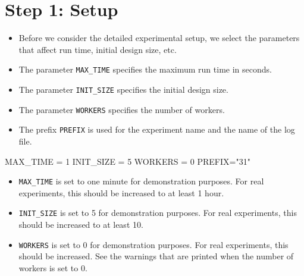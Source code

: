 \documentclass[
  letterpaper,
  DIV=11,
  numbers=noendperiod]{scrreprt}
\newenvironment{Shaded}{\begin{snugshade}}{\end{snugshade}}
\newcommand{\DecValTok}[1]{\textcolor[rgb]{0.68,0.00,0.00}{#1}}
\newcommand{\NormalTok}[1]{\textcolor[rgb]{0.00,0.23,0.31}{#1}}
\newcommand{\OperatorTok}[1]{\textcolor[rgb]{0.37,0.37,0.37}{#1}}
\newcommand{\StringTok}[1]{\textcolor[rgb]{0.13,0.47,0.30}{#1}}
\providecommand{\tightlist}{%
  \setlength{\itemsep}{0pt}\setlength{\parskip}{0pt}}\usepackage{longtable,booktabs,array}
\begin{document}
\hypertarget{sec-setup-31}{%
\section{Step 1: Setup}\label{sec-setup-31}}

\begin{itemize}
\tightlist
\item
  Before we consider the detailed experimental setup, we select the
  parameters that affect run time, initial design size, etc.
\item
  The parameter \texttt{MAX\_TIME} specifies the maximum run time in
  seconds.
\item
  The parameter \texttt{INIT\_SIZE} specifies the initial design size.
\item
  The parameter \texttt{WORKERS} specifies the number of workers.
\item
  The prefix \texttt{PREFIX} is used for the experiment name and the
  name of the log file.
\end{itemize}

\begin{Shaded}
\begin{Highlighting}[]
\NormalTok{MAX\_TIME }\OperatorTok{=} \DecValTok{1}
\NormalTok{INIT\_SIZE }\OperatorTok{=} \DecValTok{5}
\NormalTok{WORKERS }\OperatorTok{=} \DecValTok{0}
\NormalTok{PREFIX}\OperatorTok{=}\StringTok{"31"}
\end{Highlighting}
\end{Shaded}

\begin{tcolorbox}[enhanced jigsaw, left=2mm, title=\textcolor{quarto-callout-caution-color}{\faFire}\hspace{0.5em}{Caution: Run time and initial design size should be increased for real
experiments}, titlerule=0mm, toprule=.15mm, leftrule=.75mm, colbacktitle=quarto-callout-caution-color!10!white, colback=white, arc=.35mm, toptitle=1mm, bottomtitle=1mm, colframe=quarto-callout-caution-color-frame, bottomrule=.15mm, rightrule=.15mm, breakable, coltitle=black, opacitybacktitle=0.6, opacityback=0]

\begin{itemize}
\tightlist
\item
  \texttt{MAX\_TIME} is set to one minute for demonstration purposes.
  For real experiments, this should be increased to at least 1 hour.
\item
  \texttt{INIT\_SIZE} is set to 5 for demonstration purposes. For real
  experiments, this should be increased to at least 10.
\item
  \texttt{WORKERS} is set to 0 for demonstration purposes. For real
  experiments, this should be increased. See the warnings that are
  printed when the number of workers is set to 0.
\end{itemize}

\end{tcolorbox}
\end{document}
